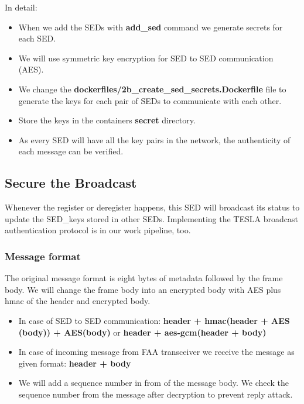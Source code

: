 \documentclass[11pt,oneside,onecolumn,letterpaper]{article}
\begin{document}
In detail:
\begin{itemize}
  \item When we add the SEDs with \textbf{add\_sed}  
      command we generate secrets for each SED. 
      \item We will use symmetric key encryption for SED to SED communication (AES).
      \item We change the  \textbf{dockerfiles/2b\_create\_sed\_secrets.Dockerfile} file to generate the keys for each pair of SEDs to communicate with each other.
      \item Store the keys in the containers \textbf{secret} directory.
      \item As every SED will have all the key pairs in the network, the authenticity of each message can be verified.
\end{itemize}

\subsection{Secure the Broadcast}
Whenever the register or deregister happens, this SED will broadcast its status to update the SED\_keys stored in other SEDs.
Implementing the TESLA broadcast authentication protocol is in our work pipeline, too.

\subsubsection{Message format}
The original message format is eight bytes of metadata followed by the frame body.
We will change the frame body into an encrypted body with AES plus hmac of the header and encrypted body.

  \begin{itemize}
  \item In case of SED to SED communication: \textbf{header + hmac(header + AES (body)) + AES(body)} or \textbf{header + aes-gcm(header + body)}
  \item In case of incoming message from FAA transceiver we receive the message as given format: \textbf{header + body}
  \end{itemize}
  \begin{itemize}
  \item We will add a sequence number in from of the message body. We check the sequence number from the message after decryption to prevent reply attack.
  \end{itemize}
\end{document}
